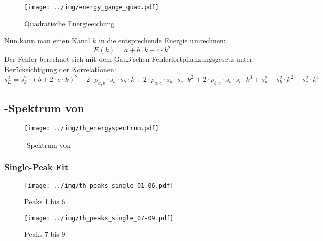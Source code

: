 \begin{figure}[H]
\begin{center}
  \texttt{[image: ../img/energy\_gauge\_quad.pdf]}
  \caption{Quadratische Energieeichung}
  \label{img:gauge:quad}
\end{center}
\end{figure}
Nun kann man einen Kanal $k$ in die entsprechende Energie umrechnen:
\begin{equation}
  E(k) = a + b \cdot k + c \cdot k^2
\end{equation}
Der Fehler berechnet sich mit dem Gauß'schen Fehlerfortpflanzungsgesetz unter Berücksichtigung der Korrelationen:
\begin{equation}
  s_E^2 = s_{k}^2 \cdot (b + 2 \cdot c \cdot k)^2 + 2 \cdot \rho_{a, b} \cdot s_{a} \cdot s_{b} \cdot k + 2 \cdot \rho_{a, c} \cdot s_{a} \cdot s_{c} \cdot k^2 +
  2 \cdot \rho_{b, c} \cdot s_{b} \cdot s_{c} \cdot k^3 + s_{a}^2 + s_{b}^2 \cdot k^2 + s_{c}^2 \cdot k^4
\end{equation}

\subsection{\textgamma-Spektrum von }
\begin{figure}[H]
\begin{center}
  \texttt{[image: ../img/th\_energyspectrum.pdf]}
  \caption{\textgamma-Spektrum von }
  \label{img:th:spectrum}
\end{center}
\end{figure}

\subsubsection{Single-Peak Fit} %
\begin{figure}[H]
\begin{center}
  \texttt{[image: ../img/th\_peaks\_single\_01-06.pdf]}
  \caption{Peaks 1 bis 6}
  \label{img:th:peaks:single:0106}
\end{center}
\end{figure}

\begin{figure}[H]
\begin{center}
  \texttt{[image: ../img/th\_peaks\_single\_07-09.pdf]}
  \caption{Peaks 7 bis 9}
  \label{img:th:peaks:single:0709}
\end{center}
\end{figure}

